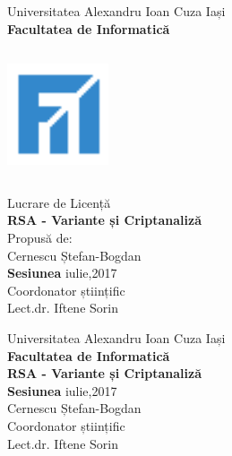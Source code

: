 \documentclass[12pt, oneside]{book}
\begin{document}
\begin{titlepage}
\begin{center}
\vspace*{1cm}
{\Huge Universitatea Alexandru Ioan Cuza Iași} \\
\vspace{0.5cm}
{\huge \textbf{Facultatea de Informatică}} \\
\vspace{1.5cm}
\includegraphics[width=3cm,height=4.5cm,keepaspectratio]{logo_fii3.png} \\
\vspace{1cm}
Lucrare de Licență \\ 
\vspace{0.5cm}
{\Large \textbf{RSA - Variante și Criptanaliză}} \\
\vspace{1cm}
{ \small Propusă de: \\}
{\large Cernescu Ștefan-Bogdan} \\
\vspace{1cm}
{\Large \textbf{Sesiunea} iulie,2017} \\
\vspace{1cm}
{\small Coordonator științific} \\
{\large Lect.dr. Iftene Sorin}
\end{center}
\end{titlepage}

\begin{titlepage}
\center
\vspace*{1cm}
{\Huge Universitatea Alexandru Ioan Cuza Iași} \\
\vspace{0.5cm}
{\huge \textbf{Facultatea de Informatică}} \\
\vspace{3.5cm}
{\Large \textbf{RSA - Variante și Criptanaliză}} \\
\vspace{1cm}
{\Large \textbf{Sesiunea} iulie,2017} \\
{\large Cernescu Ștefan-Bogdan} \\
\vspace{3cm}
{\small Coordonator științific} \\
{\large Lect.dr. Iftene Sorin}
\end{titlepage}
\end{document}
